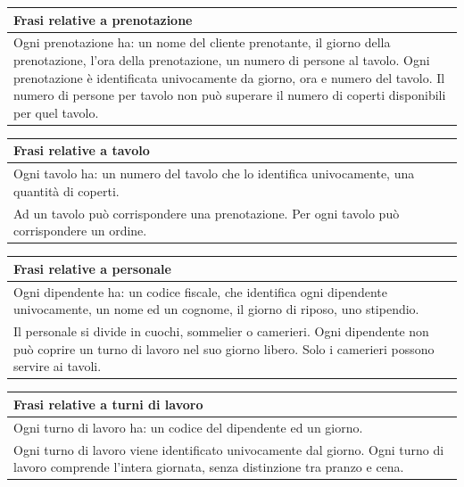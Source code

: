 \begin{longtable}{|p{17 cm}|}
    \hline
    \textbf{Frasi relative a prenotazione} \\ \hline
    Ogni prenotazione ha: un nome del cliente prenotante, il giorno della prenotazione, l'ora della prenotazione, un numero di persone al tavolo. 
    Ogni prenotazione è identificata univocamente da giorno, ora e numero del tavolo.
    Il numero di persone per tavolo non può superare il numero di coperti disponibili per
    quel tavolo.
    \\ \hline
\end{longtable}

\begin{longtable}{|p{17 cm}|}
    \hline
    \textbf{Frasi relative a tavolo} \\ \hline
    Ogni tavolo ha: un numero del tavolo che lo identifica univocamente, una quantità di coperti. \\
    Ad un tavolo può corrispondere una prenotazione. 
    Per ogni tavolo può corrispondere un ordine.
    \\ \hline
\end{longtable}
\begin{longtable}{|p{17 cm}|}
    \hline
    \textbf{Frasi relative a personale} \\ \hline
    Ogni dipendente ha: un codice fiscale, che identifica ogni dipendente univocamente, un nome ed un cognome, il giorno di riposo, uno stipendio. \\
    Il personale si divide in cuochi, sommelier o camerieri.
    Ogni dipendente non può coprire un turno di lavoro nel suo giorno libero.
    Solo i camerieri possono servire ai tavoli.
    \\ \hline
\end{longtable}
\begin{longtable}{|p{17 cm}|}
    \hline
    \textbf{Frasi relative a turni di lavoro} \\ \hline
    Ogni turno di lavoro ha: un codice del dipendente ed un giorno. \\
    Ogni turno di lavoro viene identificato univocamente dal giorno.
    Ogni turno di lavoro comprende l’intera giornata, senza distinzione tra pranzo e cena.
    \\ \hline
\end{longtable}

